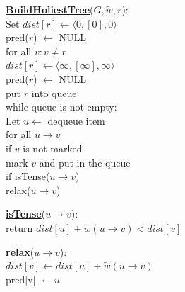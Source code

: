 \documentclass{article}
\begin{document}
\begin{minipage}[t]{0.48\linewidth}
\begin{algorithm}
\textbf{\underline{BuildHoliestTree}}($G, \tilde w , r$): \\ \quad
Set $dist[r] \leftarrow \langle 0, [0], 0 \rangle$ \\ \quad \quad
    pred($r$) $\leftarrow$ NULL \\ \quad
for all $v : v \neq r$ \\ \quad \quad
    $dist[r] \leftarrow \langle \infty, [\infty], \infty \rangle$ \\ \quad \quad
    pred($r$) $\leftarrow$ NULL \\ \quad
put $r$ into queue \\ \quad
while queue is not empty: \\ \quad \quad
    Let $u \leftarrow$ dequeue item \\ \quad \quad
    for all $u \rightarrow v$ \\ \qquad \quad
        if $v$ is not marked \\ \quad \qquad \quad
           mark $v$ and put in the queue \\ \qquad \quad
        if isTense($u \rightarrow v$) \\ \quad \qquad \quad
           relax($u \rightarrow v$)
\end{algorithm}
\end{minipage}
\hfill%
\hspace{-4cm}
\begin{minipage}[t]{0.48\linewidth}
\begin{algorithm}
\textbf{\underline{isTense}}($u \rightarrow v$): \\ \quad
return $dist[u] + \tilde w(u \rightarrow v) < dist[v]$ \\

\end{algorithm}

\vspace{0.5cm}

\begin{algorithm}
\textbf{\underline{relax}}($u \rightarrow v$): \\ \quad
$dist[v] \leftarrow dist[u] + \tilde w(u \rightarrow v)$ \\ \quad
pred[v] $\leftarrow u$ \\
\end{algorithm}
\end{minipage}

\vspace{0.5cm}
\end{document}
